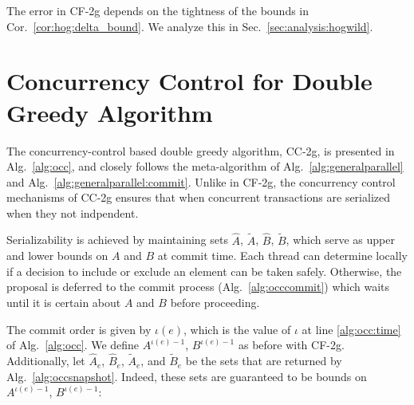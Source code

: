 \documentclass{article} %
\makeatletter
\newcommand{\hogwild}{CF-2g}
\newcommand{\occ}{CC-2g}
\newcommand{\Comments}{1}
\newcommand{\note}[2]{\ifnum\Comments=1\textcolor{#1}{#2}\fi}
\newcommand{\xinghao}[1]{\note{red}{[XP: #1]}}
\newcommand{\secref}[1]{Sec.~\ref{#1}}
\newcommand{\corref}[1]{Cor.~\ref{#1}}
\newcommand{\algref}[1]{Alg.~\ref{#1}}
\newcommand\footnoteref[1]{\protected@xdef\@thefnmark{\ref{#1}}\@footnotemark}
\makeatother
\begin{document}
The error in \hogwild{} depends on the tightness of the bounds in \corref{cor:hog:delta_bound}.
We analyze this in \secref{sec:analysis:hogwild}.











\section{Concurrency Control for Double Greedy Algorithm \label{sec:algocc}}

The concurrency-control based double greedy algorithm, \occ{}, is presented in \algref{alg:occ}, and closely follows the meta-algorithm of \algref{alg:generalparallel} and \algref{alg:generalparallel:commit}.
Unlike in \hogwild{}, the concurrency control mechanisms of \occ{} ensures that when concurrent transactions are serialized when they not indpendent.

Serializability is achieved by maintaining sets $\hat{A}$, $\tilde{A}$, $\hat{B}$, $\tilde{B}$, which serve as upper and lower bounds on $A$ and $B$ at commit time.
Each thread can determine locally if a decision to include or exclude an element can be taken safely.
Otherwise, the proposal is deferred to the commit process (\algref{alg:occcommit}) which waits until it is certain about $A$ and $B$ before proceeding.

The commit order is given by $\iota(e)$, which is the value of $\iota$ at line \ref{alg:occ:time} of \algref{alg:occ}.
We define $A^{\iota(e)-1}$, $B^{\iota(e)-1}$ as before with \hogwild{}.
Additionally, let $\hat{A}_e$, $\hat{B}_e$, $\tilde{A}_e$, and $\tilde{B}_e$ be the sets that are returned by \algref{alg:occsnapshot}\footnoteref{fn:copyvsshared}.
Indeed, these sets are guaranteed to be bounds on $A^{\iota(e)-1}$, $B^{\iota(e)-1}$:
\end{document}
